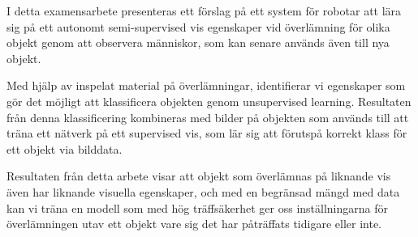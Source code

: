 I detta examensarbete presenteras ett förslag på ett system för robotar att lära sig på ett autonomt semi-supervised vis egenskaper vid överlämning för olika objekt genom att observera människor, som kan senare används även till nya objekt.

Med hjälp av inspelat material på överlämningar, identifierar vi egenskaper som gör det möjligt att klassificera objekten genom unsupervised learning. Resultaten från denna klassificering kombineras med bilder på objekten som används till att träna ett nätverk på ett supervised vis, som lär sig att förutspå korrekt klass för ett objekt via bilddata.

Resultaten från detta arbete visar att objekt som överlämnas på liknande vis även har liknande visuella egenskaper, och med en begränsad mängd med data kan vi träna en modell som med hög träffsäkerhet ger oss inställningarna för överlämningen utav ett objekt vare sig det har påträffats tidigare eller inte.
